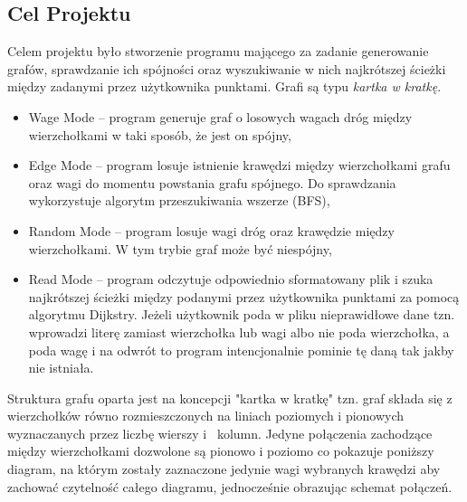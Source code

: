 \documentclass[10pt, a4paper]{report}
\begin{document}
    \subsection{Cel Projektu}
    Celem projektu było stworzenie programu mającego za zadanie generowanie grafów, sprawdzanie ich spójności oraz wyszukiwanie w nich najkrótszej ścieżki między zadanymi przez użytkownika punktami. 
    Grafi są typu \textit{kartka w kratkę}.

    \begin{itemize}
        \item Wage Mode – program generuje graf o losowych wagach dróg między wierzchołkami w taki sposób, że jest on spójny,
        \item Edge Mode – program losuje istnienie krawędzi między wierzchołkami grafu oraz wagi do momentu powstania 
        grafu spójnego. Do sprawdzania wykorzystuje algorytm przeszukiwania wszerze (BFS),
        \item Random Mode – program losuje wagi dróg oraz krawędzie między wierzchołkami. W tym trybie graf może być niespójny,
        \item Read Mode -- program odczytuje odpowiednio sformatowany plik i szuka najkrótszej ścieżki
        między podanymi przez użytkownika punktami za pomocą algorytmu Dijkstry. Jeżeli użytkownik poda w pliku nieprawidłowe dane
        tzn. wprowadzi literę zamiast wierzchołka lub wagi albo nie poda wierzchołka, a poda wagę i na odwrót to program intencjonalnie pominie tę daną tak jakby nie istniała.
    \end{itemize}
    Struktura grafu oparta jest na koncepcji "kartka w kratkę" tzn. graf składa się z wierzchołków równo rozmieszczonych na liniach poziomych 
    i pionowych wyznaczanych przez liczbę wierszy i~ kolumn. Jedyne połączenia zachodzące między wierzchołkami dozwolone są  pionowo i poziomo co pokazuje poniższy diagram, na którym zostały zaznaczone jedynie wagi wybranych krawędzi aby zachować czytelność całego diagramu, jednocześnie obrazując schemat połączeń.
\end{document}
